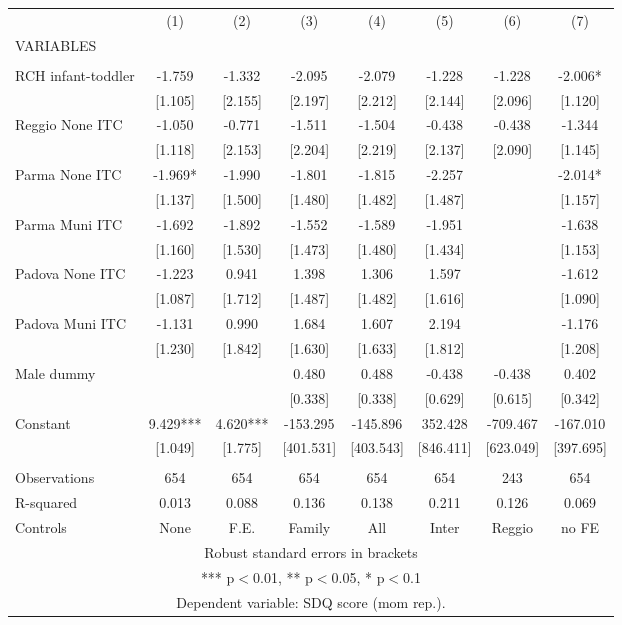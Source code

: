 \begin{tabular}{lccccccc} \hline
 & (1) & (2) & (3) & (4) & (5) & (6) & (7) \\
VARIABLES &  &  &  &  &  &  &  \\ \hline
 &  &  &  &  &  &  &  \\
RCH infant-toddler & -1.759 & -1.332 & -2.095 & -2.079 & -1.228 & -1.228 & -2.006* \\
 & [1.105] & [2.155] & [2.197] & [2.212] & [2.144] & [2.096] & [1.120] \\
Reggio None ITC & -1.050 & -0.771 & -1.511 & -1.504 & -0.438 & -0.438 & -1.344 \\
 & [1.118] & [2.153] & [2.204] & [2.219] & [2.137] & [2.090] & [1.145] \\
Parma None ITC & -1.969* & -1.990 & -1.801 & -1.815 & -2.257 &  & -2.014* \\
 & [1.137] & [1.500] & [1.480] & [1.482] & [1.487] &  & [1.157] \\
Parma Muni ITC & -1.692 & -1.892 & -1.552 & -1.589 & -1.951 &  & -1.638 \\
 & [1.160] & [1.530] & [1.473] & [1.480] & [1.434] &  & [1.153] \\
Padova None ITC & -1.223 & 0.941 & 1.398 & 1.306 & 1.597 &  & -1.612 \\
 & [1.087] & [1.712] & [1.487] & [1.482] & [1.616] &  & [1.090] \\
Padova Muni ITC & -1.131 & 0.990 & 1.684 & 1.607 & 2.194 &  & -1.176 \\
 & [1.230] & [1.842] & [1.630] & [1.633] & [1.812] &  & [1.208] \\
Male dummy &  &  & 0.480 & 0.488 & -0.438 & -0.438 & 0.402 \\
 &  &  & [0.338] & [0.338] & [0.629] & [0.615] & [0.342] \\
Constant & 9.429*** & 4.620*** & -153.295 & -145.896 & 352.428 & -709.467 & -167.010 \\
 & [1.049] & [1.775] & [401.531] & [403.543] & [846.411] & [623.049] & [397.695] \\
 &  &  &  &  &  &  &  \\
Observations & 654 & 654 & 654 & 654 & 654 & 243 & 654 \\
R-squared & 0.013 & 0.088 & 0.136 & 0.138 & 0.211 & 0.126 & 0.069 \\
 Controls & None & F.E. & Family & All & Inter & Reggio & no FE \\ \hline
\multicolumn{8}{c}{ Robust standard errors in brackets} \\
\multicolumn{8}{c}{ *** p$<$0.01, ** p$<$0.05, * p$<$0.1} \\
\multicolumn{8}{c}{ Dependent variable: SDQ score (mom rep.).} \\
\end{tabular}

